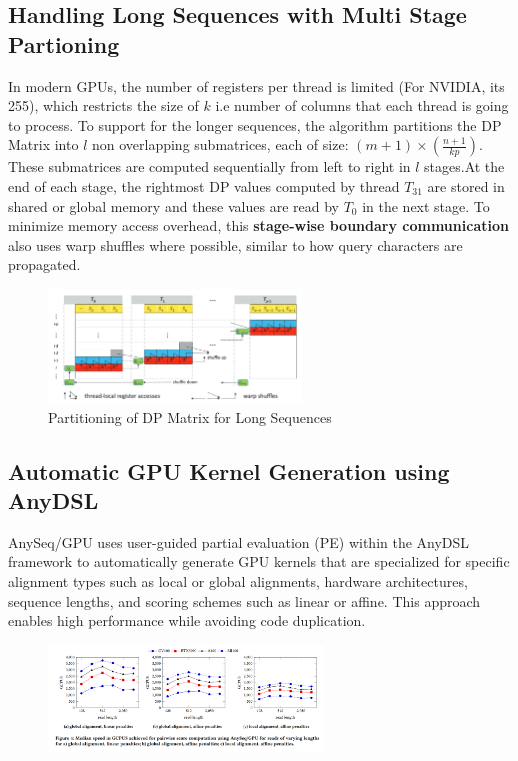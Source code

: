 \documentclass{article}
\begin{document}
\subsection*{Handling Long Sequences with Multi Stage Partioning}
In modern GPUs, the number of registers per thread is limited (For NVIDIA, its 255), which restricts the size of $k$ i.e number of columns that each thread is going to process. To support for the longer sequences, the algorithm partitions the DP Matrix into $l$ non overlapping submatrices, each of size: $(m+1) \times (\frac{n+1}{kp})$. These submatrices are computed sequentially from left to right in $l$ stages.At the end of each stage, the rightmost DP values computed by thread $T_{31}$ are stored in shared or global memory and these values are read by $T_0$ in the next stage. To minimize memory access overhead, this \textbf{stage-wise boundary communication} also uses warp shuffles where possible, similar to how query characters are propagated.
\begin{figure}[h]
    \centering
    \includegraphics[width=0.6\textwidth]{partition.png}
    \caption{Partitioning of DP Matrix for Long Sequences}
    \label{fig:partitioning}
\end{figure}

\subsection*{Automatic GPU Kernel Generation using AnyDSL}
AnySeq/GPU uses user-guided partial evaluation (PE) within the AnyDSL framework to automatically generate GPU kernels that are specialized for specific alignment types such as local or global alignments, hardware architectures, sequence lengths, and scoring schemes such as linear or affine. This approach enables high performance while avoiding code duplication.
\begin{figure}[h]
    \centering
    \includegraphics[width=0.65\textwidth]{results1.png}
\end{figure}
\end{document}
